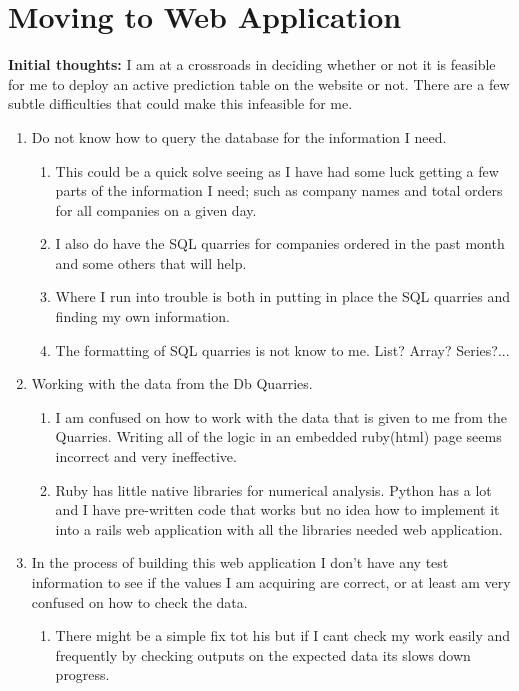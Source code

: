 \documentclass[12pt]{article}
\begin{document}
\section{Moving to Web Application}
\textbf{Initial thoughts:} I am at a crossroads in deciding whether or not it is feasible for me to deploy an active prediction table on the website or not. There are a few subtle difficulties that could make this infeasible for me.
\begin{enumerate}
   \item Do not know how to query the database for the information I need.
   	\begin{enumerate}
   	  \item This could be a quick solve seeing as I have had some luck getting a few parts of the information I need; such as company names and total orders for all companies on a given day.
      \item I also do have the SQL quarries for companies ordered in the past month and some others that will help.
      \item Where I run into trouble is both in putting in place the SQL quarries and finding my own information.
      \item The formatting of SQL quarries is not know to me. List? Array? Series?...
   \end{enumerate}
   
   \item Working with the data from the Db Quarries.
   \begin{enumerate}
     \item I am confused on how to work with the data that is given to me from the Quarries. Writing all of the logic in an embedded ruby(html) page seems incorrect and very ineffective.
     \item Ruby has little native libraries for numerical analysis. Python has a lot and I have pre-written code that works but no idea how to implement it into a rails web application with all the libraries needed web application.
   \end{enumerate}
   
   \item In the process of building this web application I don't have any test information to see if the values I am acquiring are correct, or at least am very confused on how to check the data.
   \begin{enumerate}
   	 \item There might be a simple fix tot his but if I cant check my work easily and frequently by checking outputs on the expected data its slows down progress.
   \end{enumerate}
\end{enumerate}
\end{document}
